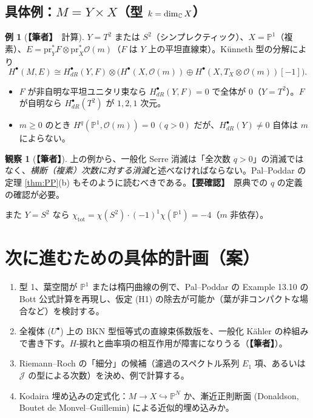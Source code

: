 \documentclass[11pt,a4paper]{article}
\theoremstyle{definition}
\newtheorem{ex}[defn]{例}
\newtheorem{obs}[defn]{観察}
\newcommand{\own}{\textcolor{red!65!black}{\textbf{【筆者】}}}
\newcommand{\chk}{\textcolor{orange!80!black}{\textbf{【要確認】}}}
\newcommand{\Jc}{\mathcal J}
\begin{document}
\subsection{具体例：$M=Y\times X$（型 $k=\dim_\mathbb C X$）}
\begin{ex}[\own\ 計算]\label{ex:prod}
$Y=T^2$ または $S^2$（シンプレクティック）、$X=\mathbb P^1$（複素）、$E=\mathrm{pr}_Y^*F\otimes\mathrm{pr}_X^*\mathcal O(m)$（$F$ は $Y$ 上の平坦直線束）。Künneth 型の分解により
\[H^\bullet(M,E)\cong H^\bullet_{dR}(Y,F)\otimes\Big(H^\bullet(X,\mathcal O(m))\oplus H^\bullet(X,T_X\otimes\mathcal O(m))[-1]\Big).\]
\begin{itemize}
\item $F$ が非自明な平坦ユニタリ束なら $H_{dR}^\bullet(Y,F)=0$ で全体が 0（$Y=T^2$）。$F$ が自明なら $H_{dR}^\bullet(T^2)$ が $1,2,1$ 次元。
\item $m\ge0$ のとき $H^q(\mathbb P^1,\mathcal O(m))=0\ (q>0)$ だが、$H^\bullet_{dR}(Y)\ne0$ 自体は $m$ によらない。
\end{itemize}
\end{ex}
\begin{obs}[\own]
上の例から、一般化 Serre 消滅は「全次数 $q>0$」の消滅ではなく、\emph{横断（複素）次数に対する消滅}と述べなければならない。Pal--Poddar の定理 \ref{thm:PP}(b) もそのように読むべきである。\chk\ 原典での $q$ の定義の確認が必要。
\end{obs}
また $Y=S^2$ なら $\chi_{\mathrm{tot}}=\chi(S^2)\cdot(-1)^1\chi(\mathbb P^1)=-4$（$m$ 非依存）。

\section{次に進むための具体的計画（案）}
\begin{enumerate}
\item 型 1、葉空間が $\mathbb P^1$ または楕円曲線の例で、Pal--Poddar の Example 13.10 の Bott 公式計算を再現し、仮定 (H1) の除去が可能か（葉が非コンパクトな場合など）を検討する。
\item 全複体 ($U^\bullet$) 上の BKN 型恒等式の直線束係数版を、一般化 Kähler の枠組みで書き下す。$H$-捩れと曲率項の相互作用が障害になりうる（\own）。
\item Riemann--Roch の「細分」の候補（濾過のスペクトル系列 $E_1$ 項、あるいは $\Jc$ の型による次数）を決め、例で計算する。
\item Kodaira 埋め込みの定式化：$M\to X\hookrightarrow\mathbb P^N$ か、漸近正則断面 (Donaldson, Boutet de Monvel--Guillemin) による近似的埋め込みか。
\end{enumerate}
\end{document}
